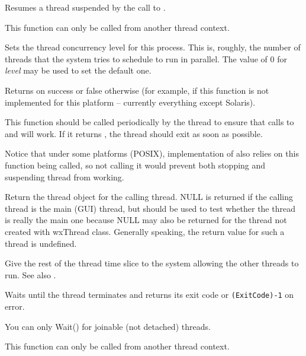 \label{wxthreadresume}


Resumes a thread suspended by the call to .

This function can only be called from another thread context.


\label{wxthreadsetconcurrency}


Sets the thread concurrency level for this process. This is, roughly, the
number of threads that the system tries to schedule to run in parallel.
The value of $0$ for {\it level} may be used to set the default one.

Returns \true on success or false otherwise (for example, if this function is
not implemented for this platform -- currently everything except Solaris).


\label{wxthreadtestdestroy}


This function should be called periodically by the thread to ensure that calls
to  and  will
work. If it returns \true, the thread should exit as soon as possible.

Notice that under some platforms (POSIX), implementation of 
 also relies on this function being called, so
not calling it would prevent both stopping and suspending thread from working.


\label{wxthreadthis}


Return the thread object for the calling thread. NULL is returned if the calling thread
is the main (GUI) thread, but  should be used to test
whether the thread is really the main one because NULL may also be returned for the thread
not created with wxThread class. Generally speaking, the return value for such a thread
is undefined.


\label{wxthreadyield}


Give the rest of the thread time slice to the system allowing the other threads to run.
See also .


\label{wxthreadwait}


Waits until the thread terminates and returns its exit code or {\tt (ExitCode)-1} on error.

You can only Wait() for joinable (not detached) threads.

This function can only be called from another thread context.

